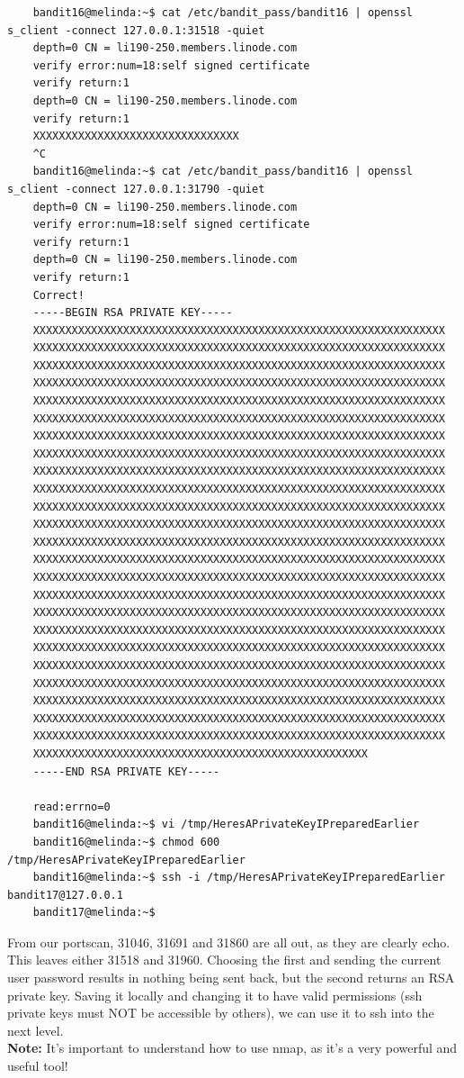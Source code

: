 \documentclass[11pt]{article}
\begin{document}
\begin{lstlisting}
	bandit16@melinda:~$ cat /etc/bandit_pass/bandit16 | openssl s_client -connect 127.0.0.1:31518 -quiet
	depth=0 CN = li190-250.members.linode.com
	verify error:num=18:self signed certificate
	verify return:1
	depth=0 CN = li190-250.members.linode.com
	verify return:1
	XXXXXXXXXXXXXXXXXXXXXXXXXXXXXXXX
	^C
	bandit16@melinda:~$ cat /etc/bandit_pass/bandit16 | openssl s_client -connect 127.0.0.1:31790 -quiet
	depth=0 CN = li190-250.members.linode.com
	verify error:num=18:self signed certificate
	verify return:1
	depth=0 CN = li190-250.members.linode.com
	verify return:1
	Correct!
	-----BEGIN RSA PRIVATE KEY-----
	XXXXXXXXXXXXXXXXXXXXXXXXXXXXXXXXXXXXXXXXXXXXXXXXXXXXXXXXXXXXXXXX
	XXXXXXXXXXXXXXXXXXXXXXXXXXXXXXXXXXXXXXXXXXXXXXXXXXXXXXXXXXXXXXXX
	XXXXXXXXXXXXXXXXXXXXXXXXXXXXXXXXXXXXXXXXXXXXXXXXXXXXXXXXXXXXXXXX
	XXXXXXXXXXXXXXXXXXXXXXXXXXXXXXXXXXXXXXXXXXXXXXXXXXXXXXXXXXXXXXXX
	XXXXXXXXXXXXXXXXXXXXXXXXXXXXXXXXXXXXXXXXXXXXXXXXXXXXXXXXXXXXXXXX
	XXXXXXXXXXXXXXXXXXXXXXXXXXXXXXXXXXXXXXXXXXXXXXXXXXXXXXXXXXXXXXXX
	XXXXXXXXXXXXXXXXXXXXXXXXXXXXXXXXXXXXXXXXXXXXXXXXXXXXXXXXXXXXXXXX
	XXXXXXXXXXXXXXXXXXXXXXXXXXXXXXXXXXXXXXXXXXXXXXXXXXXXXXXXXXXXXXXX
	XXXXXXXXXXXXXXXXXXXXXXXXXXXXXXXXXXXXXXXXXXXXXXXXXXXXXXXXXXXXXXXX
	XXXXXXXXXXXXXXXXXXXXXXXXXXXXXXXXXXXXXXXXXXXXXXXXXXXXXXXXXXXXXXXX
	XXXXXXXXXXXXXXXXXXXXXXXXXXXXXXXXXXXXXXXXXXXXXXXXXXXXXXXXXXXXXXXX
	XXXXXXXXXXXXXXXXXXXXXXXXXXXXXXXXXXXXXXXXXXXXXXXXXXXXXXXXXXXXXXXX
	XXXXXXXXXXXXXXXXXXXXXXXXXXXXXXXXXXXXXXXXXXXXXXXXXXXXXXXXXXXXXXXX
	XXXXXXXXXXXXXXXXXXXXXXXXXXXXXXXXXXXXXXXXXXXXXXXXXXXXXXXXXXXXXXXX
	XXXXXXXXXXXXXXXXXXXXXXXXXXXXXXXXXXXXXXXXXXXXXXXXXXXXXXXXXXXXXXXX
	XXXXXXXXXXXXXXXXXXXXXXXXXXXXXXXXXXXXXXXXXXXXXXXXXXXXXXXXXXXXXXXX
	XXXXXXXXXXXXXXXXXXXXXXXXXXXXXXXXXXXXXXXXXXXXXXXXXXXXXXXXXXXXXXXX
	XXXXXXXXXXXXXXXXXXXXXXXXXXXXXXXXXXXXXXXXXXXXXXXXXXXXXXXXXXXXXXXX
	XXXXXXXXXXXXXXXXXXXXXXXXXXXXXXXXXXXXXXXXXXXXXXXXXXXXXXXXXXXXXXXX
	XXXXXXXXXXXXXXXXXXXXXXXXXXXXXXXXXXXXXXXXXXXXXXXXXXXXXXXXXXXXXXXX
	XXXXXXXXXXXXXXXXXXXXXXXXXXXXXXXXXXXXXXXXXXXXXXXXXXXXXXXXXXXXXXXX
	XXXXXXXXXXXXXXXXXXXXXXXXXXXXXXXXXXXXXXXXXXXXXXXXXXXXXXXXXXXXXXXX
	XXXXXXXXXXXXXXXXXXXXXXXXXXXXXXXXXXXXXXXXXXXXXXXXXXXXXXXXXXXXXXXX
	XXXXXXXXXXXXXXXXXXXXXXXXXXXXXXXXXXXXXXXXXXXXXXXXXXXXXXXXXXXXXXXX
	XXXXXXXXXXXXXXXXXXXXXXXXXXXXXXXXXXXXXXXXXXXXXXXXXXXX
	-----END RSA PRIVATE KEY-----

	read:errno=0
	bandit16@melinda:~$ vi /tmp/HeresAPrivateKeyIPreparedEarlier
	bandit16@melinda:~$ chmod 600 /tmp/HeresAPrivateKeyIPreparedEarlier
	bandit16@melinda:~$ ssh -i /tmp/HeresAPrivateKeyIPreparedEarlier bandit17@127.0.0.1
	bandit17@melinda:~$
\end{lstlisting}
From our portscan, 31046, 31691 and 31860 are all out, as they are clearly echo. This leaves either 31518 and 31960. Choosing the first and sending
the current user password results in nothing being sent back, but the second returns an RSA private key. Saving it locally and changing it to have valid permissions (ssh private keys must NOT be accessible by others), we can use it to ssh into the next level.\\
\textbf{Note:} It's important to understand how to use nmap, as it's a very powerful and useful tool!
\end{document}
